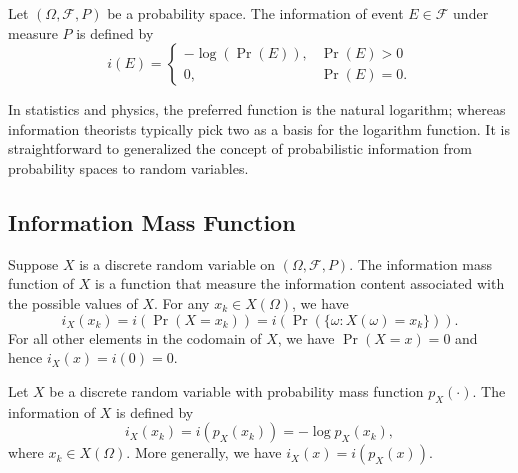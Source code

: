 \begin{definition}
Let $(\Omega, \mathcal{F}, P)$ be a probability space.
The information of event $E \in \mathcal{F}$ under measure $P$ is defined by
\begin{equation*}
i(E) = \begin{cases} - \log \left( \Pr (E) \right), & \Pr (E) > 0 \\
0, & \Pr (E) = 0 . \end{cases}
\end{equation*}
\end{definition}

In statistics and physics, the preferred function is the natural logarithm; whereas information theorists typically pick two as a basis for the logarithm function.
It is straightforward to generalized the concept of probabilistic information from probability spaces to random variables.


\subsection{Information Mass Function}

Suppose $X$ is a discrete random variable on $(\Omega, \mathcal{F}, P)$.
The information mass function of $X$ is a function that measure the information content associated with the possible values of $X$.
For any $x_k \in X(\Omega)$, we have
\begin{equation*}
i_X (x_k) = i \left( \Pr (X = x_k) \right) = i \left( \Pr \left( \{ \omega : X(\omega) = x_k \} \right) \right) .
\end{equation*}
For all other elements in the codomain of $X$, we have $\Pr (X = x) = 0$ and hence $i_X (x) = i (0) = 0$.

\begin{definition}[IMF]
Let $X$ be a discrete random variable with probability mass function $p_X (\cdot)$.
The information of $X$ is defined by
\begin{equation*}
i_X (x_k) = i \left( p_X (x_k) \right) = - \log p_X (x_k),
\end{equation*}
where $x_k \in X(\Omega)$.
More generally, we have $i_X (x) = i \left( p_X (x) \right)$.
\end{definition}

